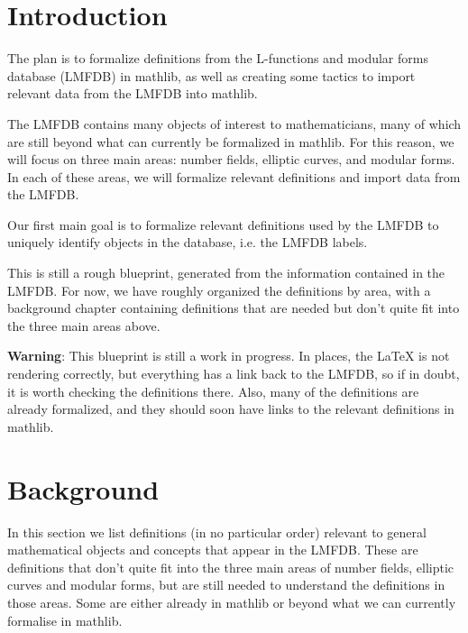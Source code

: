 
\tableofcontents

\chapter{Introduction}

The plan is to formalize definitions from the L-functions and modular forms database (LMFDB) in mathlib, as well as creating some tactics to import relevant data from the LMFDB into mathlib.

The LMFDB contains many objects of interest to mathematicians, many of which are still beyond what can currently be formalized in mathlib. For this reason, we will focus on three main areas: number fields, elliptic curves, and modular forms. In each of these areas, we will formalize relevant definitions and import data from the LMFDB.

Our first main goal is to formalize relevant definitions used by the LMFDB to uniquely identify objects in the database, i.e. the LMFDB labels.

This is still a rough blueprint, generated from the information contained in the LMFDB. For now, we have roughly organized the definitions by area, with a background chapter containing definitions that are needed but don't quite fit into the three main areas above.

\textbf{Warning}: This blueprint is still a work in progress. In places, the LaTeX is not rendering correctly, but everything has a link back to the LMFDB, so if in doubt, it is worth checking the definitions there. Also, many of the definitions are already formalized, and they should soon have links to the relevant definitions in mathlib.

\chapter{Background}

In this section we list definitions (in no particular order) relevant to general mathematical objects and concepts that appear in the LMFDB.
These are definitions that don't quite fit into the three main areas of number fields, elliptic curves and modular forms, but are still needed to understand the definitions in those areas.
Some are either already in mathlib or  beyond what we can currently formalise in mathlib.


